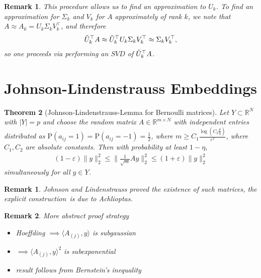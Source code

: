 \documentclass[13pt]{article}
\newtheorem{thm}{Theorem}[section]
\theoremstyle{plain}
\newtheorem{remark}[thm]{Remark}
\newtheorem*{remark*}{Remark}
\newcommand{\R}{\mathbb{R}}
\renewcommand{\P}{\bm{\mathrm{P}}}
\newcommand{\til}{\ensuremath{\tilde}}
\begin{document}
\begin{remark}
    This procedure allows us to find an approximation to $U_k$.
    To find an approximation for $\Sigma_k$ and $V_k$ for $A$ approximately
    of rank $k$, we note that $A \approx A_k = U_k \Sigma_k V_k^\top$,
    and therefore
    \[
        \begin{aligned}
            \til{U}_k^\top A \approx \til{U}_k^\top U_k \Sigma_k V_k^\top \approx \Sigma_k V_k^\top,
        \end{aligned}
    \]
    so one proceeds via performing an $SVD$ of $\til{U}_k^\top A$.
\end{remark}

\newpage

\section{Johnson-Lindenstrauss Embeddings}

\begin{thm}[Johnson-Lindenstrauss-Lemma for Bernoulli matrices]
    Let $Y \subset \R^N$ with $|Y| = p$ and choose the random matrix
    $A \in \R^{m \times N}$ with independent entries distributed
    as $\P(a_{ij} = 1) = \P(a_{ij} = -1) = \frac{1}{2}$,
    where $m \ge C_1\frac{\log\left( C_2 \frac{p}{\eta} \right)}{\varepsilon^2}$, where $C_1, C_2$
    are absolute constants.
    Then with probability at least $1 - \eta$,
    \[
        \begin{aligned}
            (1-\varepsilon)\|y\|_2^2 \le \|\frac{1}{\sqrt{m}}Ay\|_2^2 \le (1+\varepsilon)\|y\|_2^2
        \end{aligned}
    \]
    simultaneously for all $y \in Y$.
\end{thm}

\begin{remark*}
    Johnson and Lindenstrauss proved the existence of such matrices,
    the explicit construction is due to Achlioptas.
\end{remark*}

\begin{remark*}
    More abstract proof strategy
    \begin{itemize}
        \item Hoeffding $\implies \langle A_{(j)}, y\rangle$ is subgaussian
        \item $\implies \langle A_{(j)}, y\rangle^2$ is subexponential
        \item result follows from Bernstein's inequality
    \end{itemize}
\end{remark*}
\end{document}
